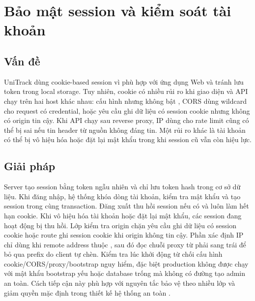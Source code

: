 \section{Bảo mật session và kiểm soát tài khoản}

\subsection{Vấn đề}

UniTrack dùng cookie-based session vì phù hợp với ứng dụng Web và tránh lưu token trong local storage. Tuy nhiên, cookie có nhiều rủi ro khi giao diện và API chạy trên hai host khác nhau: cấu hình  nhưng không bật , CORS dùng wildcard cho request có credential, hoặc yêu cầu ghi dữ liệu có session cookie nhưng không có origin tin cậy. Khi API chạy sau reverse proxy, IP dùng cho rate limit cũng có thể bị sai nếu tin header  từ nguồn không đáng tin. Một rủi ro khác là tài khoản có thể bị vô hiệu hóa hoặc đặt lại mật khẩu trong khi session cũ vẫn còn hiệu lực.

\subsection{Giải pháp}

Server tạo session bằng token ngẫu nhiên và chỉ lưu token hash trong cơ sở dữ liệu. Khi đăng nhập, hệ thống khóa dòng tài khoản, kiểm tra mật khẩu và tạo session trong cùng transaction. Đăng xuất thu hồi session nếu có và luôn làm hết hạn cookie. Khi vô hiệu hóa tài khoản hoặc đặt lại mật khẩu, các session đang hoạt động bị thu hồi. Lớp kiểm tra origin chặn yêu cầu ghi dữ liệu có session cookie hoặc route ghi session cookie khi origin không tin cậy. Phần xác định IP chỉ dùng  khi remote address thuộc , sau đó đọc chuỗi proxy từ phải sang trái để bỏ qua prefix do client tự chèn. Kiểm tra lúc khởi động từ chối cấu hình cookie/CORS/proxy/bootstrap nguy hiểm, đặc biệt production không được chạy với mật khẩu bootstrap yếu hoặc database trống mà không có đường tạo admin an toàn. Cách tiếp cận này phù hợp với nguyên tắc bảo vệ theo nhiều lớp và giảm quyền mặc định trong thiết kế hệ thống an toàn \cite{saltzer1975protection}.

\figAccountControlLock
\clearpage

